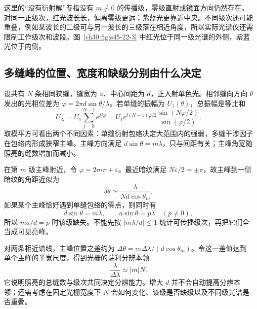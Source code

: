 这里的“没有衍射解”专指没有 $m\ne0$ 的传播级，零级直射或镜面方向仍然存在。对同一正级次，红光波长长，偏离零级更远；紫蓝光更靠近中央。不同级次还可能重叠，例如某波长的二级可与另一波长的三级落在相近角度，所以实际光谱仪还需限制工作级次和波段。图~\ref{ch30:fig:s45-22-3} 中红光位于同一级光谱的外侧，紫蓝光位于内侧。



\subsection{多缝峰的位置、宽度和缺级分别由什么决定}
设共有 $N$ 条相同狭缝，缝宽为 $a$、中心间距为 $d$，正入射单色光。相邻缝向方向 $\theta$ 发出的光相位差为 $\varphi=2\pi d\sin\theta/\lambda$。若单缝的振幅为 $U_1(\theta)$，总振幅是等比和
\[
 U_N=U_1\sum_{j=0}^{N-1}e^{\ii j\varphi}
 =U_1e^{\ii(N-1)\varphi/2}
 \frac{\sin(N\varphi/2)}{\sin(\varphi/2)}.
\]
取模平方可看出两个不同因素：单缝衍射包络决定大范围内的强弱，多缝干涉因子在包络内形成狭窄主峰。主峰方向满足 $d\sin\theta=m\lambda$，只与间距有关；主峰角宽随照亮的缝数增加而减小。

在第 $m$ 级主峰附近，令 $\varphi=2m\pi+\varepsilon$。最近暗纹满足 $N\varepsilon/2=\pm\pi$，故主峰到一侧暗纹的角距近似为
\[
 \delta\theta\simeq\frac{\lambda}{Nd\cos\theta_m}.
\]
如果某个主峰恰好遇到单缝包络的零点，则同时有
\[
 d\sin\theta=m\lambda,\qquad a\sin\theta=p\lambda\quad(p\ne0),
\]
所以 $ma/d=p$ 时该级缺失。不能先按 $|m\lambda/d|\le1$ 统计可传播级次，再把它们全当成可见亮峰。

对两条相近谱线，主峰位置之差约为 $\Delta\theta=m\Delta\lambda/(d\cos\theta_m)$。令这一差值达到单个主峰的半宽尺度，得到光栅的瑞利分辨本领
\[
 \frac{\lambda}{\Delta\lambda}\simeq |m|N.
\]
它说明照亮的总缝数与级次共同决定分辨能力。增大 $d$ 并不会自动提高分辨本领；还需考虑在固定光栅宽度下 $N$ 会如何变化、该级是否缺级以及不同级光谱是否重叠。


\GridPatternDiagram

